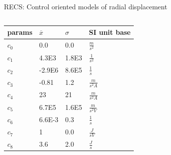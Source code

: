 \documentclass{beamer}
\begin{document}
\begin{frame}{RECS: Control oriented models of radial displacement}
\begin{columns}
\begin{column}{0.4\textwidth}
\begin{table}
	\begin{center}
		\begin{tabular}{| l | l | l | l |}
			\hline
			params & $\overline{x}$ & $\sigma$ & SI unit base \\ \hline
			$c_0$ & 0.0 & 0.0 & $\frac{m}{s^2}$ \\ \hline
			$c_1$ & 4.3E3 & 1.8E3 & $\frac{1}{s^2}$ \\ \hline
			$c_2$ & -2.9E6 & 8.6E5 & $\frac{1}{s}$ \\ \hline
			$c_3$ & -0.81 & 1.2 	& $\frac{m}{s^2A}$ \\ \hline
			$c_4$ & 23 & 21 & $\frac{m}{s^2A}$ \\ \hline
			$c_5$ & 6.7E5 & 1.6E5 & $\frac{m}{s^2V}$ \\ \hline
			$c_6$ & 6.6E-3 & 0.3 & $\frac{1}{s}$ \\ \hline
			$c_7$ & 1 & 0.0 & $\frac{J}{sV}$ \\ \hline
			$c_8$ & 3.6 & 2.0 & $\frac{J}{s}$ \\ \hline
		\end{tabular}
	\end{center}
\end{table}
    \end{column}
    
\end{columns}

\end{frame}
\end{document}
